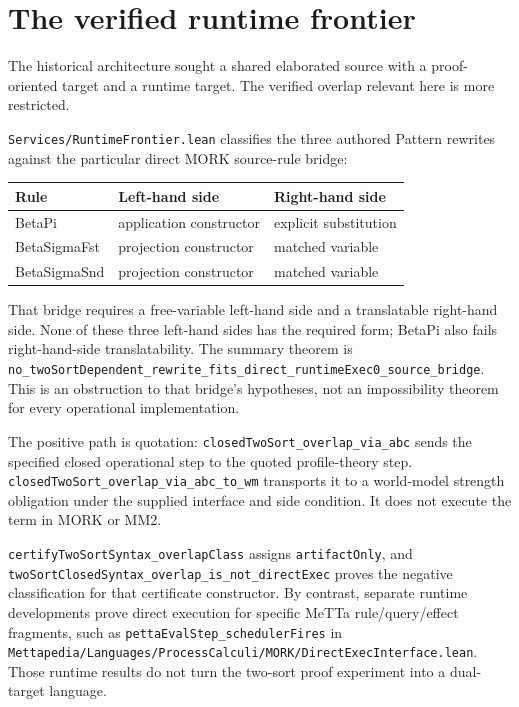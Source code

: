 \documentclass[11pt]{article}
\newcommand{\code}[1]{\nolinkurl{#1}}
\begin{document}
\section{The verified runtime frontier}
\label{sec:runtime}

The historical architecture sought a shared elaborated source with a
proof-oriented target and a runtime target. The verified overlap relevant
here is more restricted.

\code{Services/RuntimeFrontier.lean} classifies the three authored Pattern
rewrites against the particular direct MORK source-rule bridge:
\begin{center}
\begin{tabular}{@{}lll@{}}
\toprule
Rule & Left-hand side & Right-hand side \\
\midrule
BetaPi & application constructor & explicit substitution \\
BetaSigmaFst & projection constructor & matched variable \\
BetaSigmaSnd & projection constructor & matched variable \\
\bottomrule
\end{tabular}
\end{center}
That bridge requires a free-variable left-hand side and a translatable
right-hand side. None of these three left-hand sides has the required form;
BetaPi also fails right-hand-side translatability. The summary theorem is
\code{no_twoSortDependent_rewrite_fits_direct_runtimeExec0_source_bridge}.
This is an obstruction to that bridge's hypotheses, not an impossibility
theorem for every operational implementation.

The positive path is quotation:
\code{closedTwoSort_overlap_via_abc} sends the specified closed operational
step to the quoted profile-theory step.
\code{closedTwoSort_overlap_via_abc_to_wm} transports it to a world-model
strength obligation under the supplied interface and side condition.
It does not execute the term in MORK or MM2.

\code{certifyTwoSortSyntax_overlapClass} assigns \code{artifactOnly},
and \code{twoSortClosedSyntax_overlap_is_not_directExec} proves the negative
classification for that certificate constructor.
By contrast, separate runtime developments prove direct execution for
specific MeTTa rule/query/effect fragments, such as
\code{pettaEvalStep_schedulerFires} in
\code{Mettapedia/Languages/ProcessCalculi/MORK/DirectExecInterface.lean}.
Those runtime results do not turn the two-sort proof experiment into a
dual-target language.
\end{document}
